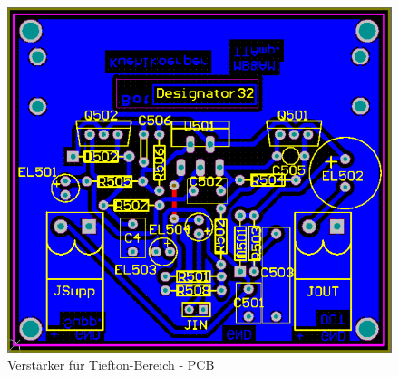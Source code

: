 \begin{figure} [H]
	\centering	
	\includegraphics[width=1\textwidth]{img/Print5/5_TTVerstaerker-PCB.PNG}
	\caption{Verstärker für Tiefton-Bereich - PCB}
	\label {fig:4.4.3.1}
\end{figure}


